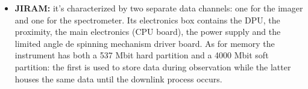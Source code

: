\begin{itemize}
    \item \textbf{JIRAM:} it's characterized by two separate data channels: one for the imager and one for the spectrometer. Its electronics box contains the DPU, the proximity, the main electronics (CPU board), the power supply and the limited angle de spinning mechanism driver board. \cite{JIRAM_info} As for memory the instrument has both a 537 Mbit hard partition and a 4000 Mbit soft partition: the first is used to store data during observation while the latter houses the same data until the downlink process occurs. \cite{JIRAM_info_2}      
\end{itemize}